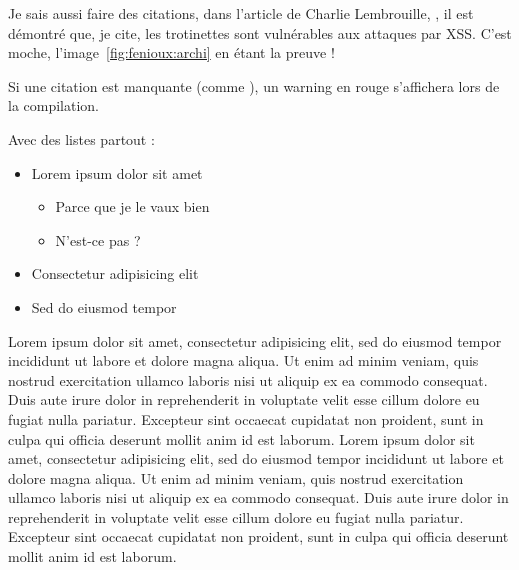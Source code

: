 
Je sais aussi faire des citations, dans l'article de Charlie
Lembrouille, \cite{fenioux:charlielembrouille}, il est démontré que, je cite,
\og{}les trotinettes sont vulnérables aux attaques par XSS\fg{}. C'est
moche, l'image~\ref{fig:fenioux:archi} en étant la preuve !

Si une citation est manquante (comme \cite{fenioux:referencefoireuse}),
un warning en rouge s'affichera lors de la compilation.

Avec des listes partout :

\begin{itemize}
\item Lorem ipsum dolor sit amet
  \begin{itemize}
  \item Parce que je le vaux bien
  \item N'est-ce pas ?
  \end{itemize}
\item Consectetur adipisicing elit
\item Sed do eiusmod tempor
\end{itemize}

Lorem ipsum dolor sit amet, consectetur adipisicing elit, sed do
eiusmod tempor incididunt ut labore et dolore magna aliqua. Ut enim ad
minim veniam, quis nostrud exercitation ullamco laboris nisi ut
aliquip ex ea commodo consequat. Duis aute irure dolor in
reprehenderit in voluptate velit esse cillum dolore eu fugiat nulla
pariatur. Excepteur sint occaecat cupidatat non proident, sunt in
culpa qui officia deserunt mollit anim id est laborum. Lorem ipsum
dolor sit amet, consectetur adipisicing elit, sed do eiusmod tempor
incididunt ut labore et dolore magna aliqua. Ut enim ad minim veniam,
quis nostrud exercitation ullamco laboris nisi ut aliquip ex ea
commodo consequat. Duis aute irure dolor in reprehenderit in voluptate
velit esse cillum dolore eu fugiat nulla pariatur. Excepteur sint
occaecat cupidatat non proident, sunt in culpa qui officia deserunt
mollit anim id est laborum.

